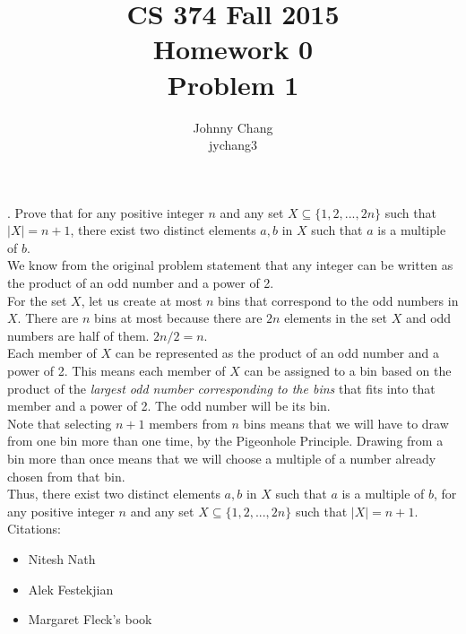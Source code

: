 \documentclass[letterpaper, 10pt]{article}
\begin{document}
\title{CS 374 Fall 2015\\
Homework 0\\
Problem 1
}

\author{Johnny Chang \\ jychang3}
\maketitle

. Prove that for any positive integer $n$ and any set $X \subseteq \{1, 2, ..., 2n\}$ such that $|X| = n + 1$, there exist two distinct elements $a, b$ in $X$ such that $a$ is a multiple of $b$.\\

    We know from the original problem statement that any integer can be written as the product of an odd number and a power of 2.\\

    For the set $X$, let us create at most $n$ bins that correspond to the odd numbers in $X$. There are $n$ bins at most because there are $2n$ elements in the set $X$ and odd numbers are half of them. $2n/2 = n$. \\

    Each member of $X$ can be represented as the product of an odd number and a power of 2. This means each member of $X$ can be assigned to a bin based on the product of the \emph{largest odd number corresponding to the bins} that fits into that member and a power of 2. The odd number will be its bin.\\

    Note that selecting $n+1$ members from $n$ bins means that we will have to draw from one bin more than one time, by the Pigeonhole Principle. Drawing from a bin more than once means that we will choose a multiple of a number already chosen from that bin.\\

    Thus, there exist two distinct elements $a, b$ in $X$ such that $a$ is a multiple of $b$, for any positive integer $n$ and any set $X \subseteq \{1, 2, ..., 2n\}$ such that $|X| = n + 1$.\\

    Citations:
    \begin{itemize}
        \item Nitesh Nath
        \item Alek Festekjian
        \item Margaret Fleck's book
    \end{itemize}
\end{document}
